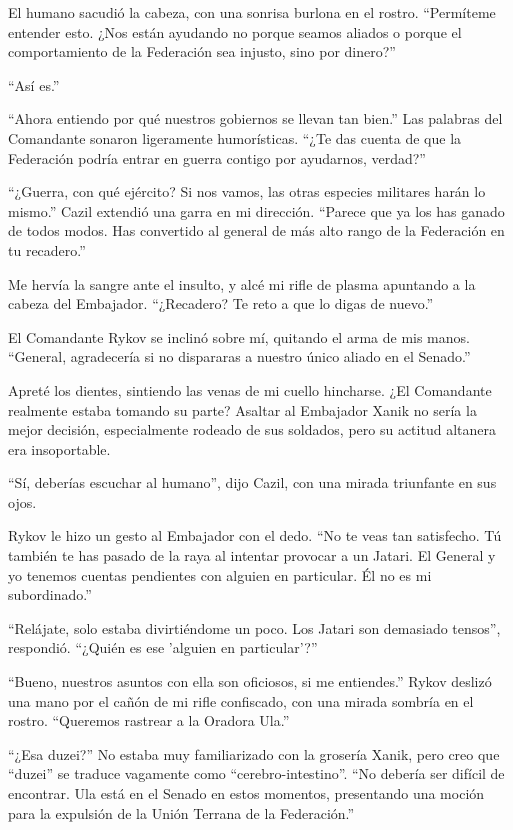 \documentclass[spanish,12pt,a4paper,oneside,titlepage]{book}
\begin{document}
    El humano sacudió la cabeza, con una sonrisa burlona en el rostro. ``Permíteme entender esto. ¿Nos están ayudando no porque seamos aliados o porque el comportamiento de la Federación sea injusto, sino por dinero?''

    ``Así es.''

    ``Ahora entiendo por qué nuestros gobiernos se llevan tan bien.'' Las palabras del Comandante sonaron ligeramente humorísticas. ``¿Te das cuenta de que la Federación podría entrar en guerra contigo por ayudarnos, verdad?''

    ``¿Guerra, con qué ejército? Si nos vamos, las otras especies militares harán lo mismo.'' Cazil extendió una garra en mi dirección. ``Parece que ya los has ganado de todos modos. Has convertido al general de más alto rango de la Federación en tu recadero.''

    Me hervía la sangre ante el insulto, y alcé mi rifle de plasma apuntando a la cabeza del Embajador. ``¿Recadero? Te reto a que lo digas de nuevo.''

    El Comandante Rykov se inclinó sobre mí, quitando el arma de mis manos. ``General, agradecería si no dispararas a nuestro único aliado en el Senado.''

    Apreté los dientes, sintiendo las venas de mi cuello hincharse. ¿El Comandante realmente estaba tomando su parte? Asaltar al Embajador Xanik no sería la mejor decisión, especialmente rodeado de sus soldados, pero su actitud altanera era insoportable.

    ``Sí, deberías escuchar al humano'', dijo Cazil, con una mirada triunfante en sus ojos.

    Rykov le hizo un gesto al Embajador con el dedo. ``No te veas tan satisfecho. Tú también te has pasado de la raya al intentar provocar a un Jatari. El General y yo tenemos cuentas pendientes con alguien en particular. Él no es mi subordinado.''

    ``Relájate, solo estaba divirtiéndome un poco. Los Jatari son demasiado tensos'', respondió. ``¿Quién es ese 'alguien en particular'?''

    ``Bueno, nuestros asuntos con ella son oficiosos, si me entiendes.'' Rykov deslizó una mano por el cañón de mi rifle confiscado, con una mirada sombría en el rostro. ``Queremos rastrear a la Oradora Ula.''

    ``¿Esa duzei?'' No estaba muy familiarizado con la grosería Xanik, pero creo que ``duzei'' se traduce vagamente como ``cerebro-intestino''. ``No debería ser difícil de encontrar. Ula está en el Senado en estos momentos, presentando una moción para la expulsión de la Unión Terrana de la Federación.''
\end{document}
